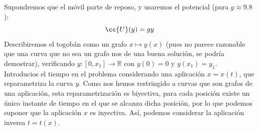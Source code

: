 \noindent
Supondremos que el móvil parte de reposo, y usaremos el potencial (para $g\approx 9.8$):
\begin{equation*}
    \cc{U}(y) = gy
\end{equation*}
Describiremos el togobán como un grafo $x\longmapsto y(x)$ (pues no parece razonable que una curva que no sea un grafo nos de una buena solución, se podría demostrar), verificando $y:[0,x_1]\to \mathbb{R}$ con $y(0) = 0$ y $y(x_1) = y_1$.\\

\noindent
Introducios el tiempo en el problema considerando una aplicación $x=x(t)$, que reparametriza la curva $y$. Como nos hemos restringido a curvas que son grafos de una aplicación, esta reparametrización es biyectiva, para cada posición existe un único instante de tiempo en el que se alcanza dicha posición, por lo que podemos suponer que la aplicación $x$ es inyectiva. Así, podemos considerar la aplicación inversa $t = t(x)$.\\

